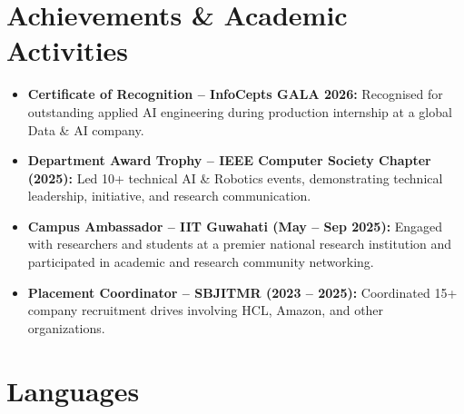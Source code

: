 \documentclass[11pt,a4paper,sans]{moderncv}
\begin{document}

\section{Achievements \& Academic Activities}

\begin{itemize}

\item
\textbf{Certificate of Recognition -- InfoCepts GALA 2026:}
Recognised for outstanding applied AI engineering during production
internship at a global Data \& AI company.

\item
\textbf{Department Award Trophy -- IEEE Computer Society Chapter (2025):}
Led 10+ technical AI \& Robotics events, demonstrating technical
leadership, initiative, and research communication.

\item
\textbf{Campus Ambassador -- IIT Guwahati (May -- Sep 2025):}
Engaged with researchers and students at a premier national research
institution and participated in academic and research community
networking.

\item
\textbf{Placement Coordinator -- SBJITMR (2023 -- 2025):}
Coordinated 15+ company recruitment drives involving HCL, Amazon,
and other organizations.

\end{itemize}


\section{Languages}


\end{document}
